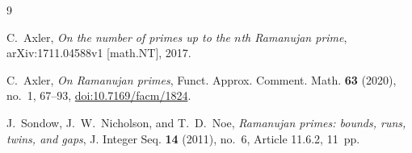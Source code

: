 \documentclass[11pt]{amsart}
\begin{document}
\begin{thebibliography}{9}

C.~Axler,
\emph{On the number of primes up to the $n$th Ramanujan prime},
arXiv:1711.04588v1 [math.NT], 2017.

C.~Axler,
\emph{On Ramanujan primes},
Funct. Approx. Comment. Math. \textbf{63} (2020), no.~1, 67--93,
\href{https://doi.org/10.7169/facm/1824}{doi:10.7169/facm/1824}.

J.~Sondow, J.~W.~Nicholson, and T.~D.~Noe,
\emph{Ramanujan primes: bounds, runs, twins, and gaps},
J. Integer Seq. \textbf{14} (2011), no.~6, Article 11.6.2, 11~pp.

\end{thebibliography}
\end{document}
